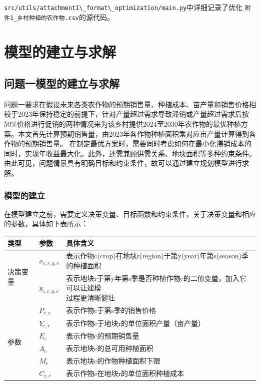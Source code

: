 \documentclass[withoutpreface]{cumcmthesis}
\begin{document}
\verb|src/utils/attachment1\_format\_optimization/main.py|中详细记录了优化
\newline
\verb|附件1_乡村种植的农作物.csv|的源代码。

\newpage
\section{模型的建立与求解}
\subsection{问题一模型的建立与求解}
问题一要求在假设未来各类农作物的预期销售量、种植成本、亩产量和销售价格相较于2023年保持稳定的前提下，针对产量超过需求导致滞销或产量超过需求后按50\%价格进行促销的两种情况来为该乡村提供2024至2030年农作物的最优种植方案。本文首先计算预期销售量，由2023年各作物种植面积乘对应亩产量计算得到各作物的预期销售量。
在制定最优方案时，需要同时考虑如何在最小化滞销成本的同时，实现年收益最大化。此外，还需兼顾供需关系、地块面积等多种约束条件。由此可见，问题情景具有明确目标和约束条件，故可以通过建立规划模型进行求解。



\subsubsection{模型的建立}
在模型建立之前，需要定义决策变量、目标函数和约束条件，关于决策变量和相应的参数，具体如下表所示：
\begin{table}[H]
    \centering
    \begin{tabular}{|l|l|l|}
        \hline
        类型 & 参数 & 具体含义 \\ \hline
        \multirow{2}{*}{决策变量} & $x_{c,r,y,s}$ & 表示作物c(crop)在地块r(region)于第y(year)年第s(season)季的种植面积 \\ \cline{2-3}
        ~ & $y_{c,r,y,s}$ & \makecell{表示地块r于第y年第s季是否种植作物c的二值变量，加入它可以让建模\\过程更清晰健壮} \\ \hline
        \multirow{6}{*}{\centering 参数} & $P_{c,s}$ & 表示作物c于第s季的销售价格 \\ \cline{2-3}
        ~ & $Y_{c,r}$ & 表示作物c于地块r的单位面积产量（亩产量） \\ \cline{2-3}
        ~ & $E_{c}$ & 表示作物c的预期销售量 \\ \cline{2-3}
        ~ & $A_c$ & 表示地块c的总可用种植面积 \\ \cline{2-3}
        ~ & $M_c$ & 表示地块c的作物种植面积下限 \\ \cline{2-3}
        ~ & $C_{c,r}$ & 表示作物c在地块r的单位面积种植成本 \\ \hline
    \end{tabular}
\end{table}
\end{document}
